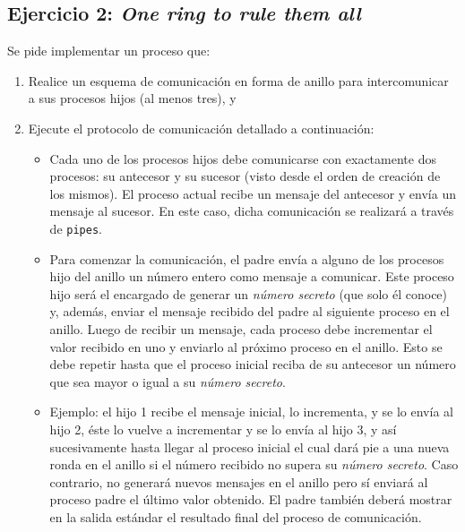 \documentclass[11pt]{article}
\begin{document}
\subsection{Ejercicio 2: \textit{One ring to rule them all}}

Se pide implementar un proceso que:
\begin{enumerate}[label=\alph*)]
	\item Realice un esquema de comunicación en forma de anillo para intercomunicar a sus procesos hijos (al menos tres), y 
	\item Ejecute el protocolo de comunicación detallado a continuación:
		\begin{itemize}
			\item Cada uno de los procesos hijos debe comunicarse con exactamente dos procesos: su antecesor y su sucesor (visto desde el orden de creación de los mismos). El proceso actual recibe un mensaje del antecesor y envía un mensaje al sucesor. En este caso, dicha comunicación se realizará a través de \texttt{pipes}. 
			\item Para comenzar la comunicación, el padre envía a alguno de los procesos hijo del anillo un número entero como mensaje a comunicar. Este proceso hijo será el encargado de generar un \textit{número secreto} (que solo él conoce) y, además, enviar el mensaje recibido del padre al siguiente proceso en el anillo. Luego de recibir un mensaje, cada proceso debe incrementar el valor recibido en uno y enviarlo al próximo proceso en el anillo. Esto se debe repetir hasta que el proceso inicial reciba de su antecesor un número que sea mayor o igual a su \textit{número secreto}.
			\item %
				Ejemplo: el hijo 1 recibe el mensaje inicial, lo incrementa, y se lo envía al hijo 2, éste lo vuelve a incrementar y se lo envía al hijo 3, y así sucesivamente hasta llegar al proceso inicial el cual dará pie a una nueva ronda en el anillo si el número recibido no supera su \textit{número secreto}. Caso contrario, no generará nuevos mensajes en el anillo pero sí enviará al proceso padre el último valor obtenido. El padre también deberá mostrar en la salida estándar el resultado final del proceso de comunicación.
		\end{itemize}
\end{enumerate}
\end{document}
